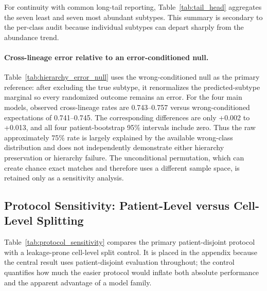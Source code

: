 \documentclass{article} %
\begin{document}
\clearpage


For continuity with common long-tail reporting, Table~\ref{tab:tail_head} aggregates the seven least and seven most abundant subtypes. This summary is secondary to the per-class audit because individual subtypes can depart sharply from the abundance trend.



\paragraph{Cross-lineage error relative to an error-conditioned null.}
Table~\ref{tab:hierarchy_error_null} uses the wrong-conditioned null as the
primary reference: after excluding the true subtype, it renormalizes the
predicted-subtype marginal so every randomized outcome remains an error. For the
four main models, observed cross-lineage rates are 0.743--0.757 versus
wrong-conditioned expectations of 0.741--0.745. The corresponding differences
are only +0.002 to +0.013, and all four patient-bootstrap 95\% intervals include
zero. Thus the raw approximately 75\% rate is largely explained by the available
wrong-class distribution and does not independently demonstrate either
hierarchy preservation or hierarchy failure. The unconditional permutation,
which can create chance exact matches and therefore uses a different sample
space, is retained only as a sensitivity analysis.



\subsection{Protocol Sensitivity: Patient-Level versus Cell-Level Splitting}
\label{sec:appendix:protocol_sensitivity}

Table~\ref{tab:protocol_sensitivity} compares the primary patient-disjoint protocol with a leakage-prone cell-level split control. It is placed in the appendix because the central result uses patient-disjoint evaluation throughout; the control quantifies how much the easier protocol would inflate both absolute performance and the apparent advantage of a model family.
\end{document}
